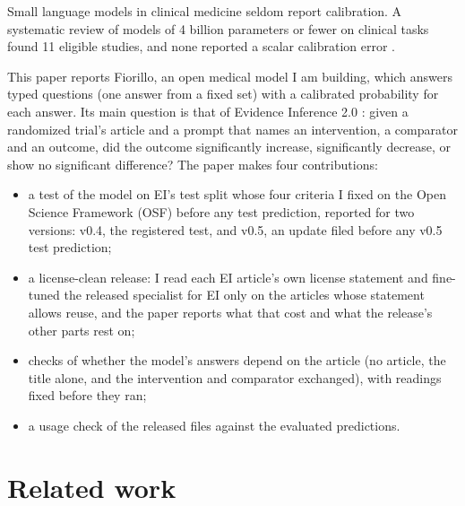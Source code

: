 \documentclass[11pt,letterpaper]{article}
\begin{document}
Small language models in clinical medicine seldom report calibration. A systematic review of models of 4 billion parameters or fewer on clinical tasks found 11 eligible studies, and none reported a scalar calibration error \citep{gorenshtein2026}.

This paper reports Fiorillo, an open medical model I am building, which answers typed questions (one answer from a fixed set) with a calibrated probability for each answer. Its main question is that of Evidence Inference 2.0 \citep[EI;][]{lehman2019,deyoung2020}: given a randomized trial's article and a prompt that names an intervention, a comparator and an outcome, did the outcome significantly increase, significantly decrease, or show no significant difference? The paper makes four contributions:
\begin{itemize}\setlength{\itemsep}{1pt}
\item a test of the model on EI's test split whose four criteria I fixed on the Open Science Framework (OSF) before any test prediction, reported for two versions: v0.4, the registered test, and v0.5, an update filed before any v0.5 test prediction;
\item a license-clean release: I read each EI article's own license statement and fine-tuned the released specialist for EI only on the articles whose statement allows reuse, and the paper reports what that cost and what the release's other parts rest on;
\item checks of whether the model's answers depend on the article (no article, the title alone, and the intervention and comparator exchanged), with readings fixed before they ran;
\item a usage check of the released files against the evaluated predictions.
\end{itemize}

\section{Related work}
\label{sec:related}
\end{document}
